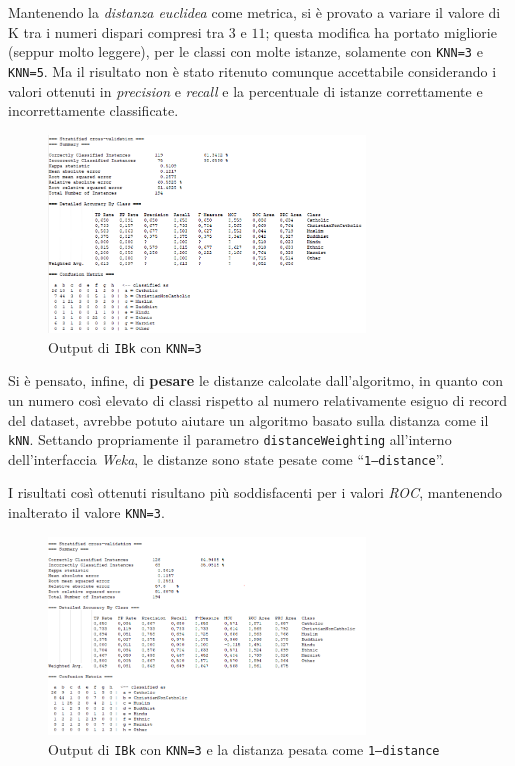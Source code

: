 \documentclass[a4paper,11pt,twoside,notitlepage,final]{scrartcl}
\begin{document}
Mantenendo la \emph{distanza euclidea} come metrica, si è provato a variare il valore di K tra i numeri dispari compresi tra \(3\) e \(11\);
questa modifica ha portato migliorie (seppur molto leggere), per le classi con molte istanze, solamente con \texttt{KNN=3} e \texttt{KNN=5}.
Ma il risultato non è stato ritenuto comunque accettabile considerando i valori ottenuti in \emph{precision} e \emph{recall} e la percentuale di istanze correttamente e incorrettamente classificate.

\begin{figure}[H]
  \centering
  \includegraphics[width=0.75\textwidth]{fig/kNN3.PNG}%
  \caption{Output di \texttt{IBk} con \texttt{KNN=3}}%
  \label{fig:ibk:9}
\end{figure}

Si è pensato, infine, di \textbf{pesare} le distanze calcolate dall'algoritmo, in quanto con un numero così elevato di classi rispetto al numero relativamente esiguo di record del dataset, avrebbe potuto aiutare un algoritmo basato sulla distanza come il \texttt{kNN}.
Settando propriamente il parametro \texttt{distanceWeighting} all'interno dell'interfaccia \emph{Weka}, le distanze sono state pesate come ``\texttt{1--distance}''.

I risultati così ottenuti risultano più soddisfacenti per i valori \emph{ROC}, mantenendo inalterato il valore \texttt{KNN=3}.

\begin{figure}[H]
  \centering
  \includegraphics[width=0.75\textwidth]{fig/kNNWeighted.PNG}%
  \caption{Output di \texttt{IBk} con \texttt{KNN=3} e la distanza pesata come \texttt{1--distance}}%
  \label{fig:ibk:9}
\end{figure}
\end{document}
